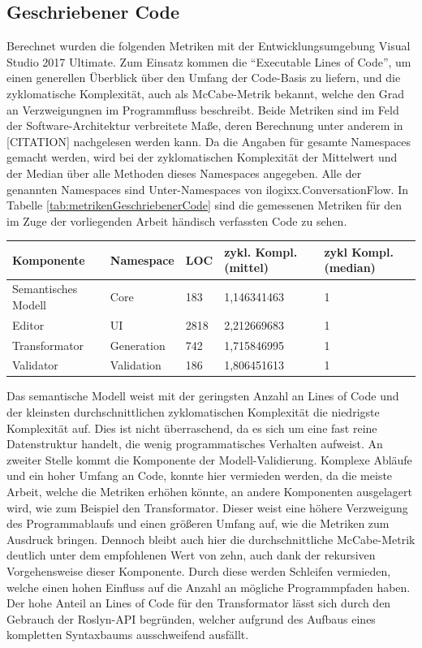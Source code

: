 \subsection{Geschriebener Code}
Berechnet wurden die folgenden Metriken mit der Entwicklungsumgebung Visual Studio 2017 Ultimate. Zum Einsatz kommen die ``Executable Lines of Code'', um einen generellen Überblick über den Umfang der Code-Basis zu liefern, und die zyklomatische Komplexität, auch als McCabe-Metrik bekannt, welche den Grad an Verzweigungnen im Programmfluss beschreibt. Beide Metriken sind im Feld der Software-Architektur verbreitete Maße, deren Berechnung unter anderem in [CITATION] nachgelesen werden kann. Da die Angaben für gesamte Namespaces gemacht werden, wird bei der zyklomatischen Komplexität der Mittelwert und der Median über alle Methoden dieses Namespaces angegeben. Alle der genannten Namespaces sind Unter-Namespaces von ilogixx.ConversationFlow. In Tabelle \ref{tab:metrikenGeschriebenerCode} sind die gemessenen Metriken für den im Zuge der vorliegenden Arbeit händisch verfassten Code zu sehen.
\begin{center}
    \begin{tabular}{| p{} | p{} | p{} | p{} | p{} |}
    \hline
    Komponente & Namespace & LOC & zykl. Kompl. (mittel) & zykl Kompl. (median)\\ \hline
    Semantisches Modell & Core & 183 & 1,146341463 & 1 \\ \hline
    Editor & UI & 2818 & 2,212669683 & 1 \\ \hline
    Transformator & Generation & 742 & 1,715846995 & 1 \\ \hline
    Validator & Validation & 186 & 1,806451613 & 1 \\ \hline
    \end{tabular}
    \label{tab:metrikenGeschriebenerCode}
\end{center}
Das semantische Modell weist mit der geringsten Anzahl an Lines of Code und der kleinsten durchschnittlichen zyklomatischen Komplexität die niedrigste Komplexität auf. Dies ist nicht überraschend, da es sich um eine fast reine Datenstruktur handelt, die wenig programmatisches Verhalten aufweist. An zweiter Stelle kommt die Komponente der Modell-Validierung. Komplexe Abläufe und ein hoher Umfang an Code, konnte hier vermieden werden, da die meiste Arbeit, welche die Metriken erhöhen könnte, an andere Komponenten ausgelagert wird, wie zum Beispiel den Transformator. Dieser weist eine höhere Verzweigung des Programmablaufs und einen größeren Umfang auf, wie die Metriken zum Ausdruck bringen. Dennoch bleibt auch hier die durchschnittliche McCabe-Metrik deutlich unter dem empfohlenen Wert von zehn, auch dank der rekursiven Vorgehensweise dieser Komponente. Durch diese werden Schleifen vermieden, welche einen hohen Einfluss auf die Anzahl an mögliche Programmpfaden haben. Der hohe Anteil an Lines of Code für den Transformator lässt sich durch den Gebrauch der Roslyn-API begründen, welcher aufgrund des Aufbaus eines kompletten Syntaxbaums ausschweifend ausfällt. 
